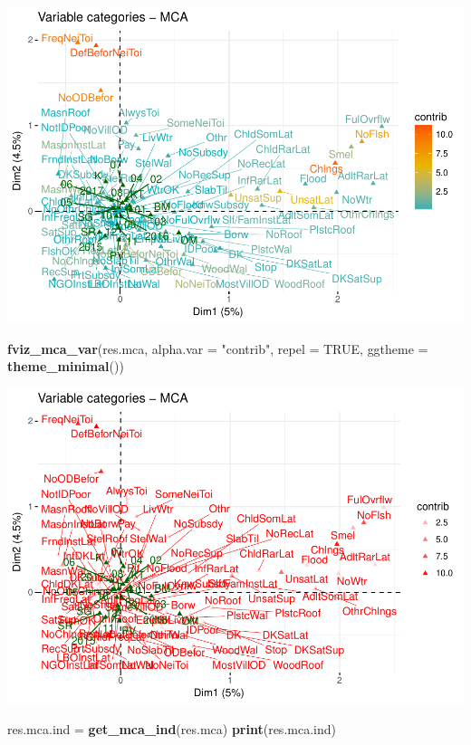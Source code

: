 \documentclass[11pt,]{article}
\newenvironment{Shaded}{\begin{snugshade}}{\end{snugshade}}
\newcommand{\DataTypeTok}[1]{\textcolor[rgb]{0.13,0.29,0.53}{#1}}
\newcommand{\KeywordTok}[1]{\textcolor[rgb]{0.13,0.29,0.53}{\textbf{#1}}}
\newcommand{\NormalTok}[1]{#1}
\newcommand{\OtherTok}[1]{\textcolor[rgb]{0.56,0.35,0.01}{#1}}
\newcommand{\StringTok}[1]{\textcolor[rgb]{0.31,0.60,0.02}{#1}}
\begin{document}
\includegraphics{describe_FSMintentions_regional_seasonal_iDE-Camb_surveysOct2017_files/figure-latex/MCA_results-13.pdf}

\begin{Shaded}
\begin{Highlighting}[]
\KeywordTok{fviz_mca_var}\NormalTok{(res.mca, }\DataTypeTok{alpha.var =} \StringTok{"contrib"}\NormalTok{,}
             \DataTypeTok{repel =} \OtherTok{TRUE}\NormalTok{,}
             \DataTypeTok{ggtheme =} \KeywordTok{theme_minimal}\NormalTok{())}
\end{Highlighting}
\end{Shaded}

\includegraphics{describe_FSMintentions_regional_seasonal_iDE-Camb_surveysOct2017_files/figure-latex/MCA_results-14.pdf}

\begin{Shaded}
\begin{Highlighting}[]
\NormalTok{res.mca.ind =}\StringTok{ }\KeywordTok{get_mca_ind}\NormalTok{(res.mca)}
\KeywordTok{print}\NormalTok{(res.mca.ind)}
\end{Highlighting}
\end{Shaded}
\end{document}
